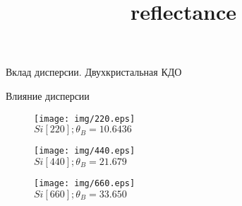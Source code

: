 \documentclass{beamer}
\title[дисперсия] %
{reflectance}
\institute[] %
\date[\today ] %
\begin{document}

\begin{frame}
  Вклад дисперсии. Двухкристальная КДО

\end{frame}




\begin{frame}{Влияние дисперсии}

\begin{figure}
\begin{minipage}[t]{.33\textwidth}
\centering
   \texttt{[image: img/220.eps]} \\
   {$Si[220]; \theta_{B} = 10.6436$}\\

\end{minipage}\hfill
\begin{minipage}[t]{.33\textwidth}
\centering
   \texttt{[image: img/440.eps]} \\
   {$Si[440]; \theta_{B} = 21.679$}\\

\end{minipage}\hfill
\begin{minipage}[t]{.33\textwidth}
\centering
   \texttt{[image: img/660.eps]} \\
	{$Si[660]; \theta_{B} = 33.650$} \\

\end{minipage}
\end{figure}
\end{frame}
\end{document}
